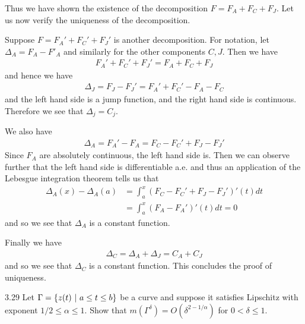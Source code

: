 \documentclass{scrartcl}
\begin{document}
\begin{solution}
Thus we have shown the existence of the decomposition $F = F_A + F_C + F_J$.
Let us now verify the uniqueness of the decomposition.

Suppose $F = F_A' + F_C' + F_J'$ is another decomposition. For notation, let $\Delta_A = F_A - F'_A$
and similarly for the other components $C,J$. Then we have \begin{align*}
    F_A' + F_C' + F_J' = F_A + F_C + F_J
\end{align*} and hence we have \begin{align*}
    \Delta_J = F_J - F_J' = F_A' + F_C' - F_A - F_C 
\end{align*} and the left hand side is a jump function, and the right hand side is continuous.
 Therefore we see that $\Delta_j = C_j$.

We also have\begin{align*}
    \Delta_A = F_A' - F_A = F_C - F_C' + F_J - F_J'
\end{align*} Since $F_A$ are absolutely continuous, the left hand side is. 
Then we can observe further that the left hand side is differentiable a.e. 
and thus an application of the Lebesgue integration theorem tells us that \begin{align*}
    \Delta_A(x) - \Delta_A(a) &= \int_a^x (F_C - F_C' + F_J - F_J')'(t)dt \\
    &= \int_a^x(F_A -F_A')'(t)dt = 0
\end{align*} and so we see that $\Delta_A$ is a constant function.

Finally we have \begin{align*}
    \Delta_C = \Delta_A + \Delta_J = C_A + C_J
\end{align*} and so we see that $\Delta_C$ is a constant function.
This concludes the proof of uniqueness.
\end{solution}

\begin{problem}{3.29}
    Let $\Gamma = \{z(t)\ \vert \  a\leq t \leq b\}$ be a curve and suppose it satisfies Lipschitz with exponent $1/2\leq \alpha\leq 1$. Show that 
    $m(\Gamma^\delta) = O(\delta^{2-1/\alpha})$ for $0<\delta\leq 1$.
\end{problem}
\end{document}

